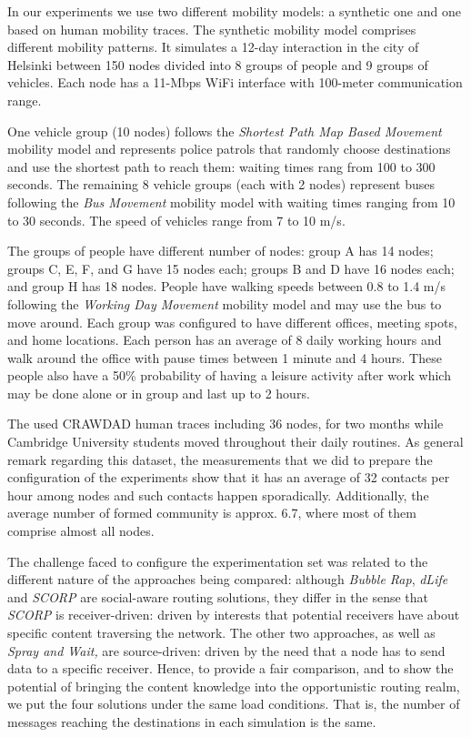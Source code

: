 \documentclass[lnicst]{svmultln}
\begin{document}
In our experiments we use two different mobility models: a synthetic
one and one based on human mobility traces. The synthetic mobility
model comprises different mobility patterns. It simulates a 12-day
interaction in the city of Helsinki between 150 nodes divided into
8 groups of people and 9 groups of vehicles. Each node has a 11-Mbps
WiFi interface with 100-meter communication range.

One vehicle group (10 nodes) follows the \emph{Shortest Path Map Based
Movement} mobility model and represents police patrols that randomly
choose destinations and use the shortest path to reach them: waiting
times rang from 100 to 300 seconds. The remaining 8 vehicle groups
(each with 2 nodes) represent buses following the \emph{Bus Movement}
mobility model with waiting times ranging from 10 to 30 seconds. The
speed of vehicles range from 7 to 10 m/s. 

The groups of people have different number of nodes: group A has 14
nodes; groups C, E, F, and G have 15 nodes each; groups B and D have
16 nodes each; and group H has 18 nodes. People have walking speeds
between 0.8 to 1.4 m/s following the \emph{Working Day Movement} mobility
model and may use the bus to move around. Each group was configured
to have different offices, meeting spots, and home locations. Each
person has an average of 8 daily working hours and walk around the
office with pause times between 1 minute and 4 hours. These people
also have a 50\% probability of having a leisure activity after work
which may be done alone or in group and last up to 2 hours.

The used CRAWDAD human traces \cite{cambridge-haggle-imote-content-2006-09-15}
including 36 nodes, for two months while Cambridge University students
moved throughout their daily routines. As general remark regarding
this dataset, the measurements that we did to prepare the configuration
of the experiments show that it has an average of 32 contacts per
hour among nodes and such contacts happen sporadically. Additionally,
the average number of formed community is approx. 6.7, where most
of them comprise almost all nodes.

The challenge faced to configure the experimentation set was related
to the different nature of the approaches being compared: although
\emph{Bubble Rap}, \emph{dLife} and \emph{SCORP} are social-aware
routing solutions, they differ in the sense that \emph{SCORP} is receiver-driven:
driven by interests that potential receivers have about specific content
traversing the network. The other two approaches, as well as \emph{Spray
and Wait,} are source-driven: driven by the need that a node has to
send data to a specific receiver. Hence, to provide a fair comparison,
and to show the potential of bringing the content knowledge into the
opportunistic routing realm, we put the four solutions under the same
load conditions. That is, the number of messages reaching the destinations
in each simulation is the same.
\end{document}
